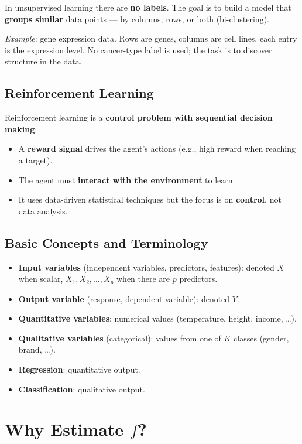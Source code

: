\documentclass[11pt,a4paper]{article}
\theoremstyle{definition}
\theoremstyle{plain}
\theoremstyle{remark}
\begin{document}
In unsupervised learning there are \textbf{no labels}. The goal is to build a model that \textbf{groups similar} data points — by columns, rows, or both (bi-clustering).

\textit{Example}: gene expression data. Rows are genes, columns are cell lines, each entry is the expression level. No cancer-type label is used; the task is to discover structure in the data.

\subsection{Reinforcement Learning}

Reinforcement learning is a \textbf{control problem with sequential decision making}:
\begin{itemize}
    \item A \textbf{reward signal} drives the agent's actions (e.g., high reward when reaching a target).
    \item The agent must \textbf{interact with the environment} to learn.
    \item It uses data-driven statistical techniques but the focus is on \textbf{control}, not data analysis.
\end{itemize}

\subsection{Basic Concepts and Terminology}

\begin{itemize}
    \item \textbf{Input variables} (independent variables, predictors, features): denoted $X$ when scalar, $X_1, X_2, \ldots, X_p$ when there are $p$ predictors.
    \item \textbf{Output variable} (response, dependent variable): denoted $Y$.
    \item \textbf{Quantitative variables}: numerical values (temperature, height, income, \ldots).
    \item \textbf{Qualitative variables} (categorical): values from one of $K$ classes (gender, brand, \ldots).
    \item \textbf{Regression}: quantitative output.
    \item \textbf{Classification}: qualitative output.
\end{itemize}


\section{Why Estimate \texorpdfstring{$f$}{f}?}
\end{document}
